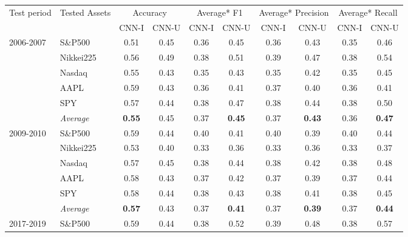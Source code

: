 \documentclass[11pt, a4paper]{article}
\begin{document}
\begin{table}[H]
\begin{tabular}{l|l|cc|cc|cc|cc}
\multicolumn{1}{m{1cm}|}{\multirow{2}{1cm}{Test period}} & \multicolumn{1}{m{1.5cm}|}{\multirow{2}{1.5cm}{Tested Assets}} & \multicolumn{2}{m{2.5cm}|}{Accuracy} & \multicolumn{2}{m{2.5cm}|}{Average* F1} & \multicolumn{2}{m{3cm}|}{Average* Precision} & \multicolumn{2}{m{2.8cm}}{Average* Recall}  \\
\cline{3-10}
&& CNN-I & CNN-U & CNN-I & CNN-U & CNN-I & CNN-U & CNN-I & CNN-U \\ \hline \hline
\multirow{6}{1cm}{2006-2007} & S\&P500          & 0.51          & 0.45 & 0.36 & 0.45          & 0.36 & 0.43          & 0.35 & 0.46          \\
& Nikkei225        & 0.56          & 0.49 & 0.38 & 0.51          & 0.39 & 0.47          & 0.38 & 0.54          \\
& Nasdaq           & 0.55          & 0.43 & 0.35 & 0.43          & 0.35 & 0.42          & 0.35 & 0.45          \\
& AAPL             & 0.59          & 0.43 & 0.36 & 0.41          & 0.37 & 0.40          & 0.36 & 0.41          \\
& SPY              & 0.57          & 0.44 & 0.38 & 0.47          & 0.38 & 0.44          & 0.38 & 0.50          \\ \cline{2-10}
& \textit{Average} & \textbf{0.55} & 0.45 & 0.37 & \textbf{0.45} & 0.37 & \textbf{0.43} & 0.36 & \textbf{0.47} \\ \hline
\multirow{6}{1cm}{2009-2010} & S\&P500          & 0.59          & 0.44 & 0.40 & 0.41          & 0.40 & 0.39          & 0.40 & 0.44          \\
& Nikkei225        & 0.53          & 0.40 & 0.33 & 0.36          & 0.33 & 0.36          & 0.33 & 0.37          \\
& Nasdaq           & 0.57          & 0.45 & 0.38 & 0.44          & 0.38 & 0.42          & 0.38 & 0.48          \\
& AAPL             & 0.58          & 0.43 & 0.37 & 0.42          & 0.37 & 0.39          & 0.37 & 0.44          \\
& SPY              & 0.58          & 0.44 & 0.38 & 0.43          & 0.38 & 0.41          & 0.38 & 0.45          \\ \cline{2-10}
& \textit{Average} & \textbf{0.57} & 0.43 & 0.37 & \textbf{0.41} & 0.37 & \textbf{0.39} & 0.37 & \textbf{0.44} \\ \hline
\multirow{6}{1cm}{2017-2019} & S\&P500          & 0.59          & 0.44 & 0.38 & 0.52          & 0.39 & 0.48          & 0.38 & 0.57          \\

\end{tabular}
\end{table}
\end{document}
